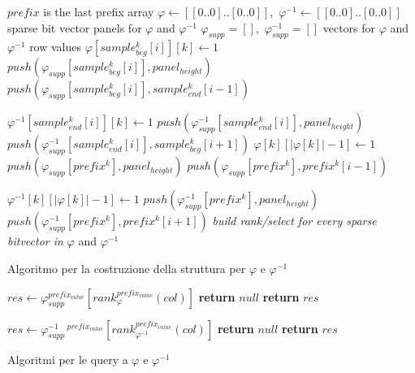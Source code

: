 \documentclass[a4paper,12pt, oneside]{book}
\begin{document}
\begin{algorithm}
  \footnotesize
  \begin{algorithmic}[1]
    \Comment  $prefix$ is the last prefix array
    \State $\varphi\gets [[0..0]..[0..0]],\,\,\varphi^{-1}\gets
    [[0..0]..[0..0]]$ 
    \Comment sparse bit vector panels for $\varphi$ and $\varphi^{-1}$
    \State $\varphi_{supp} = [],\,\,\varphi_{supp}^{-1} = []$
    \Comment vectors for $\varphi$ and $\varphi^{-1}$ row values
    \For {\textit{every} $k\in [0,|cols|)$}
    \For {\textit{every} $i\in [0,|samples_{beg}|)$}
    \State $\varphi[sample_{beg}^{k}[i]][k]\gets 1$
    \State $push(\varphi_{supp}[sample_{beg}^{k}[i]], panel_{height})$
    \Else
    \State $push(\varphi_{supp}[sample_{beg}^{k}[i]],sample_{end}^{k}[i-1])$
    \EndIf

    \State $\varphi^{-1}[sample_{end}^{k}[i]][k]\gets 1$
    \State $push(\varphi_{supp}^{-1}[sample_{end}^{k}[i]], panel_{height})$
    \Else
    \State $push(\varphi_{supp}^{-1}[sample_{end}^{k}[i]],sample_{beg}^{k}[i+1])$
    \EndIf
    \EndFor
    \EndFor
    \For {\textit{every} $k\in [0,|prefix|)$}
    \State $\varphi[k][|\varphi[k]|-1]\gets 1$
    \State $push(\varphi_{supp}[prefix^k], panel_{height})$
    \Else
    \State $push(\varphi_{supp}[prefix^k] ,prefix^k[i-1])$
    \EndIf
    \EndIf

    \State $\varphi^{-1}[k][|\varphi[k]|-1]\gets 1$
    \State $push(\varphi^{-1}_{supp}[prefix^k], panel_{height})$
    \Else
    \State $push(\varphi^{-1}_{supp}[prefix^k] ,prefix^k[i+1])$
    \EndIf
    \EndIf
    \EndFor
    \State \textit{build rank/select for every sparse bitvector in} $\varphi$
    and $\varphi^{-1}$
    \EndFunction
  \end{algorithmic}
  \caption{Algoritmo per la costruzione della struttura per $\varphi$ e
  $\varphi^{-1}$} 
\end{algorithm}
\begin{algorithm}
  \begin{algorithmic}[1]
    \State $res\gets
    \varphi_{supp}^{prefix_{value}}[rank_{\varphi}^{prefix_{value}}(col)]$ 
    \State \textbf{return} $null$
    \Else
    \State \textbf{return} $res$
    \EndIf
    \EndFunction
  \end{algorithmic}
  \begin{algorithmic}[1]
     \State $res\gets \varphi^{-1}_{supp}\,^{prefix_{value}}[rank_{\varphi^{-1}}^{prefix_{value}}(col)]$
    \State \textbf{return} $null$
    \Else
    \State \textbf{return} $res$
    \EndIf
    \EndFunction
  \end{algorithmic}
  \caption{Algoritmi per le query a $\varphi$ e $\varphi^{-1}$}
\end{algorithm}
\end{document}
